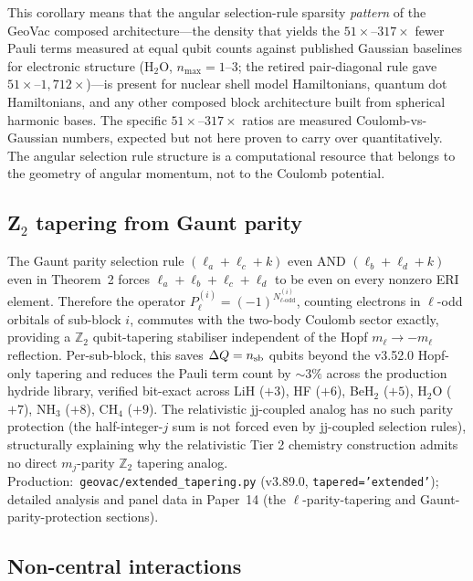 \documentclass[twocolumn,pra,amsmath,amssymb,superscriptaddress]{revtex4-2}
\begin{document}
This corollary means that the angular selection-rule sparsity
\emph{pattern} of the GeoVac composed architecture---the density that
yields the $51\times$--$317\times$ fewer Pauli terms measured at
equal qubit counts against published Gaussian baselines for
electronic structure (H$_2$O, $n_{\max} = 1$--$3$; the retired
pair-diagonal rule gave $51\times$--$1{,}712\times$)---is
present for nuclear shell model Hamiltonians, quantum dot
Hamiltonians, and any other composed block architecture built from
spherical harmonic bases.  The specific $51\times$--$317\times$
ratios are measured Coulomb-vs-Gaussian numbers, expected but
not here proven to carry over quantitatively.  The angular selection
rule structure is a computational resource that belongs to the
geometry of angular momentum, not to the Coulomb potential.

\subsection{Z$_2$ tapering from Gaunt parity}
\label{sec:ell_parity_consequence}

The Gaunt parity selection rule
$(\ell_a + \ell_c + k)$ even AND $(\ell_b + \ell_d + k)$ even
in Theorem~2 forces $\ell_a + \ell_b + \ell_c + \ell_d$ to be even
on every nonzero ERI element.  Therefore the operator
$P_\ell^{(i)} = (-1)^{N_{\ell\text{-odd}}^{(i)}}$, counting electrons
in $\ell$-odd orbitals of sub-block $i$, commutes with the two-body
Coulomb sector exactly, providing a $\mathbb{Z}_2$ qubit-tapering
stabiliser independent of the Hopf $m_\ell \to -m_\ell$ reflection.
Per-sub-block, this saves $\Delta Q = n_{\rm sb}$ qubits beyond the
v3.52.0 Hopf-only tapering and reduces the Pauli term count by
$\sim 3\%$ across the production hydride library, verified bit-exact
across LiH ($+3$), HF ($+6$), BeH$_2$ ($+5$), H$_2$O ($+7$), NH$_3$
($+8$), CH$_4$ ($+9$).  The relativistic jj-coupled analog has no
such parity protection (the half-integer-$j$ sum is not forced
even by jj-coupled selection rules), structurally explaining why
the relativistic Tier 2 chemistry construction admits no direct
$m_j$-parity $\mathbb{Z}_2$ tapering analog.  Production:\
\texttt{geovac/extended\_tapering.py} (v3.89.0,
\texttt{tapered='extended'}); detailed analysis and panel data in
Paper~14 (the $\ell$-parity-tapering and
Gaunt-parity-protection sections).

\subsection{Non-central interactions}
\end{document}
